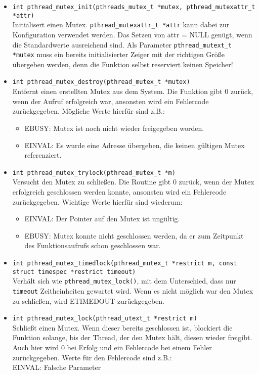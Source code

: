 \documentclass[11pt,a4paper]{article}
\begin{document}
\begin{itemize}
\item \lstinline$int pthread_mutex_init(pthreads_mutex_t *mutex, pthread_mutexattr_t *attr)$ \\
Initialisert einen Mutex. \lstinline$pthread_mutexattr_t *attr$ kann dabei zur Konfiguration verwendet werden. Das Setzen von attr = NULL genügt, wenn die Standardwerte ausreichend sind. Als Parameter \lstinline$pthread_mutext_t *mutex$ muss ein bereits initialisierter Zeiger mit der richtigen Größe übergeben werden, denn die Funktion selbst reserviert keinen Speicher!

\item \lstinline$int pthread_mutex_destroy(pthread_mutex_t *mutex)$ \\
Entfernt einen erstellten Mutex aus dem System. Die Funktion gibt 0 zurück, wenn der Aufruf erfolgreich war, ansonsten wird ein Fehlercode zurückgegeben. Mögliche Werte hierfür sind z.B.:
\begin{itemize}
	\item EBUSY: Mutex ist noch nicht wieder freigegeben worden.
	\item EINVAL: Es wurde eine Adresse übergeben, die keinen gültigen Mutex referenziert.
\end{itemize}

\item \lstinline$int pthread_mutex_trylock(pthread_mutex_t *m)$ \\
Versucht den Mutex zu schließen. Die Routine gibt 0 zurück, wenn der Mutex erfolgreich geschlossen werden konnte, ansonsten wird ein Fehlercode zurückgegeben. Wichtige Werte hierfür sind wiederum:
\begin{itemize}
	\item EINVAL: Der Pointer auf den Mutex ist ungültig.
	\item EBUSY: Mutex konnte nicht geschlossen werden, da er zum Zeitpunkt des Funktionsaufrufs schon geschlossen war.
\end{itemize}

\item \lstinline$int pthread_mutex_timedlock(pthread_mutex_t *restrict m, const struct timespec *restrict timeout)$ \\
Verhält sich wie \lstinline$pthread_mutex_lock()$, mit dem Unterschied, dass nur \lstinline$timeout$ Zeitheinheiten gewartet wird. 
Wenn es nicht möglich war den Mutex zu schließen, wird ETIMEDOUT zurückgegeben.

\item \lstinline$int pthread_mutex_lock(pthread_utext_t *restrict m)$ \\
Schließt einen Mutex. Wenn dieser bereits geschlossen ist, blockiert die Funktion solange, bis der Thread, der den Mutex hält, diesen wieder freigibt. Auch hier wird 0 bei Erfolg und ein Fehlercode bei einem Fehler zurückgegeben. Werte für den Fehlercode sind z.B.: \\ EINVAL: Falsche Parameter


\end{itemize}
\end{document}
